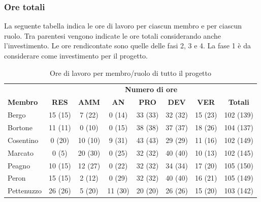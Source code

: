 	\subsubsection{Ore totali}
		La seguente tabella indica le ore di lavoro per ciascun membro e per ciascun ruolo. Tra parentesi vengono indicate le ore totali considerando anche l'investimento. Le ore rendicontate sono quelle delle fasi 2, 3 e 4. La fase 1 è da considerare come investimento per il progetto.
		\begin{table}[H]
			\centering
			\begin{tabular}{| l | c c c c c c | c |}
				\rowcolor{LightBlue}
				& \multicolumn{7}{c}{\textbf{\color{white}Numero di ore}}	\\
		
				\rowcolor{LightBlue}
				\textbf{\color{white}Membro}
				& \textbf{\color{white}RES}
				& \textbf{\color{white}AMM}
				& \textbf{\color{white}AN}
				& \textbf{\color{white}PRO}
				& \textbf{\color{white}DEV}
				& \textbf{\color{white}VER}
				& \textbf{\color{white}Totali}\\
		
				Bergo 	& 15 (15) & 7 (22)	& 0 (14)& 33 (33) 
				& 32 (32) & 15 (23)	& 102 (139)\\
				Bortone & 11  (11)  & 0 (10)	& 0	 (15)	& 38 (38) & 37 (37) & 18 (26)	& 104 (137)\\
				Cosentino 		& 0  (20) & 10 (10)	& 9 (31)	& 43 (43) & 29 (29) & 11  (16)	& 102 (149)\\
				Marcato & 0 (5) & 20 (30) & 0  (25)	& 32 (32) & 
				40 (40) & 10 (13)	& 102 (145)\\
				Peagno 	& 10  (15) & 12 (27) & 0 (22) & 32 (32) & 34 (34) & 17 (20)	& 105 (150)\\
				Peron 	& 15 (15) & 2 (12)	& 0  (29)	& 32 (32) & 40 (40) & 16  (21) & 105 (149)\\
				Pettenuzzo 	& 26 (26) & 5 (20) 	& 11  (30)	& 
				20 (20) & 26 (26) & 15 (20)	& 103 (142)\\ \hline
			\end{tabular}
			\caption{Ore di lavoro per membro/ruolo di tutto il progetto}
		\end{table}
	
